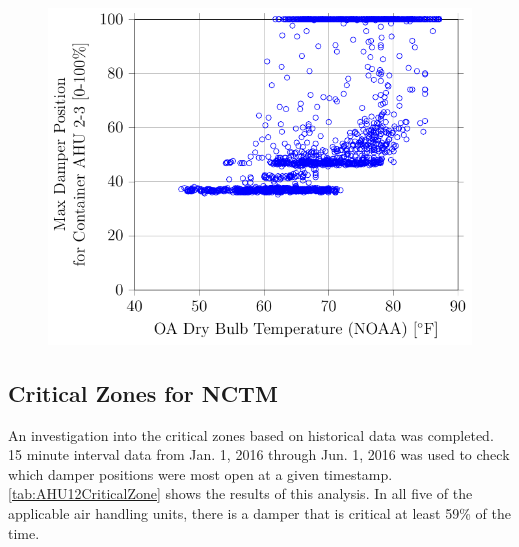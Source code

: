 \begin{figure}
\centering
\includegraphics[]{Plots/2016-06-06-1454-MaxDamperPositionforContainerAHU23vsOADryBulbTemperatureNOAA.pdf}
\caption{}
\label{fig:MaxDamperPositionforContainerAHU23vsOADryBulbTemperatureNOAA}
\end{figure}


\subsection{Critical Zones for NCTM}

An investigation into the critical zones based on historical data was
completed. 15 minute interval data from Jan. 1, 2016 through Jun. 1,
2016 was used to check which damper positions were most open at a given
timestamp. \tableref{} \ref{tab:AHU12CriticalZone} shows the results of
this analysis. In all five of the applicable air handling units, there
is a damper that is critical at least 59\% of the time. 

